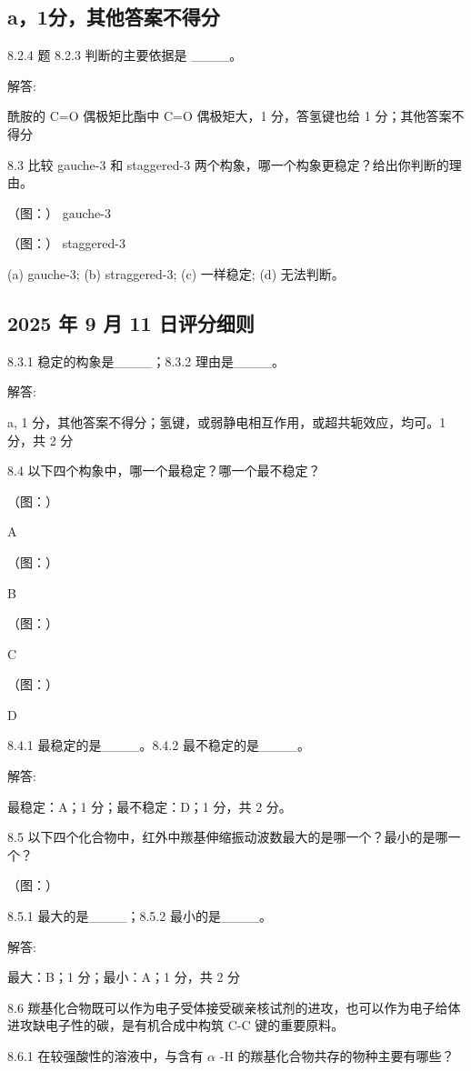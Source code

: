 \subsection*{a，1分，其他答案不得分}

8.2.4 题 8.2.3 判断的主要依据是 \_\_\_\_。

解答:

酰胺的 C=O 偶极矩比酯中 C=O 偶极矩大，1 分，答氢键也给 1 分；其他答案不得分

8.3 比较 gauche-3 和 staggered-3 两个构象，哪一个构象更稳定？给出你判断的理由。

（图：）
gauche-3

（图：）
staggered-3

(a) gauche-3; (b) straggered-3; (c) 一样稳定; (d) 无法判断。

\subsection*{2025 年 9 月 11 日评分细则}

8.3.1 稳定的构象是\_\_\_\_；8.3.2 理由是\_\_\_\_。

解答:

a, 1 分，其他答案不得分；氢键，或弱静电相互作用，或超共轭效应，均可。1 分，共 2 分

8.4 以下四个构象中，哪一个最稳定？哪一个最不稳定？

（图：）

A

（图：）

B

（图：）

C

（图：）

D

8.4.1 最稳定的是\_\_\_\_。8.4.2 最不稳定的是\_\_\_\_。

解答:

最稳定：A；1 分；最不稳定：D；1 分，共 2 分。

8.5 以下四个化合物中，红外中羰基伸缩振动波数最大的是哪一个？最小的是哪一个？

（图：）

8.5.1 最大的是\_\_\_\_；8.5.2 最小的是\_\_\_\_。

解答:

最大：B；1 分；最小：A；1 分，共 2 分

8.6 羰基化合物既可以作为电子受体接受碳亲核试剂的进攻，也可以作为电子给体进攻缺电子性的碳，是有机合成中构筑 C-C 键的重要原料。

8.6.1 在较强酸性的溶液中，与含有 $\alpha$ -H 的羰基化合物共存的物种主要有哪些？

